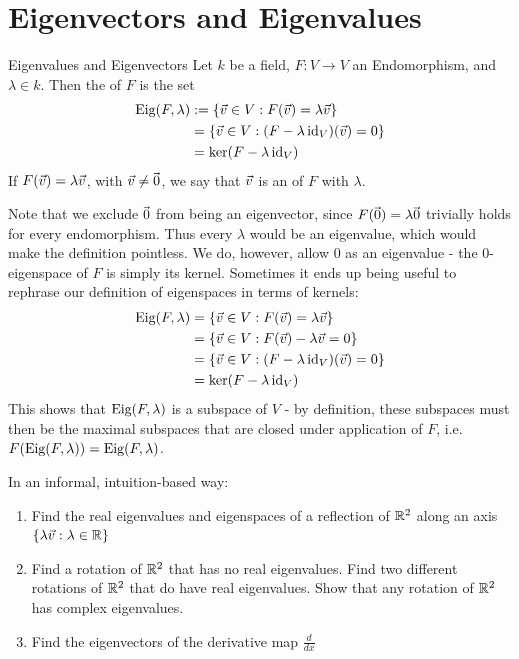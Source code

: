 \chapter{Eigenvectors and Eigenvalues}
\begin{importantdefinition}{Eigenvalues and Eigenvectors}{}
	Let $k$ be a field, $F : V \to V$ an Endomorphism, and $\lambda \in k$. Then the  of $F$ is the set
	\begin{align*}
		\textnormal{Eig}(F, \lambda) 
		&:= \qty{\vec{v}\in V : F(\vec{v}) = \lambda \vec{v}}\\ 
		&= \qty{\vec{v}\in V : (F - \lambda \operatorname{id}_V)(\vec{v}) = 0}\\
		&= \ker(F - \lambda \operatorname{id}_V)
	\end{align*}
	If $F(\vec{v}) = \lambda \vec{v}$, with $\vec{v} \neq \kern-1.2pt\vec{\kern1.2pt 0}$, we say that $\vec{v}$ is an  of $F$ with  $\lambda$.
\end{importantdefinition}
Note that we exclude $\kern-1.2pt\vec{\kern1.2pt 0}$ from being an eigenvector, since $F(\kern-1.2pt\vec{\kern1.2pt 0}) = \lambda \kern-1.2pt\vec{\kern1.2pt 0}$ trivially holds for every endomorphism. Thus every $\lambda$ would be an eigenvalue, which would make the definition pointless. We do, however, allow $0$ as an eigenvalue - the $0$-eigenspace of $F$ is simply its kernel. Sometimes it ends up being useful to rephrase our definition of eigenspaces in terms of kernels:
\begin{align*}
	\textnormal{Eig}(F, \lambda) 
	&= \qty{\vec{v}\in V : F(\vec{v}) = \lambda \vec{v}}\\
	&= \qty{\vec{v}\in V : F(\vec{v}) - \lambda \vec{v}= 0}\\
	&= \qty{\vec{v}\in V : (F - \lambda \operatorname{id}_V)(\vec{v}) = 0}\\
	&= \ker(F - \lambda \operatorname{id}_V)
\end{align*}
This shows that $\textnormal{Eig}(F, \lambda)$ is a subspace of $V$ - by definition, these subspaces must then be the maximal subspaces that are closed under application of $F$, i.e. $F(\textnormal{Eig}(F, \lambda)) = \textnormal{Eig}(F, \lambda)$.
\begin{exercise}
	In an informal, intuition-based way:
	\begin{enumerate}
		\item Find the real eigenvalues and eigenspaces of a reflection of $\mathbb{R}^2$ along an axis $\qty{\lambda \vec{v}: \lambda \in \mathbb{R}}$
		\item Find a rotation of $\mathbb{R}^2$ that has no real eigenvalues. Find two different rotations of $\mathbb{R}^2$ that do have real eigenvalues. Show that any rotation of $\mathbb{R}^2$ has complex eigenvalues.
		\item Find the eigenvectors of the derivative map $\frac{d}{dx}$
	\end{enumerate}
\end{exercise}
